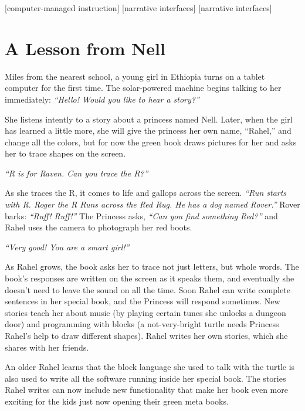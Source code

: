 \documentclass{acm_proc_article-sp}
\begin{document}
[computer-managed instruction]
[narrative interfaces]
[narrative interfaces]


\section{A Lesson from Nell}

Miles from the nearest school, a young girl in Ethiopia turns on a
tablet computer for the first time.  The solar-powered machine begins
talking to her immediately: \textit{``Hello!  Would you like to hear a story?''}

She listens intently to a story about a princess named Nell.  Later, when
the girl has learned a little more, she will give the princess her own
name, ``Rahel,'' and change all the colors, but for now the green
book draws pictures for her and asks her to trace shapes on the screen.

\textit{``R is for Raven.  Can you trace the R?''}

As she traces the R, it comes to life and gallops across the screen.
\textit{``Run starts with R.  Roger the R Runs across the Red Rug.  He has a
dog named Rover.''}  Rover barks: \textit{``Ruff! Ruff!''}  The Princess asks,
\textit{``Can you find something Red?''} and Rahel uses the camera to
photograph her red boots.

\textit{``Very good!  You are a smart girl!''}

As Rahel grows, the book asks her to trace not just letters, but whole
words.  The book's responses are written on the screen as it speaks
them, and eventually she doesn't need to leave the sound on all the
time.  Soon Rahel can write complete sentences in her special book,
and the Princess will respond sometimes.  New stories teach her about
music (by playing certain tunes she unlocks a dungeon door) and
programming with blocks (a not-very-bright turtle needs Princess Rahel's
help to draw different shapes).  Rahel writes her own stories,
which she shares with her friends.

An older Rahel learns that the block language she used to talk with
the turtle is also used to write all the software running inside
her special book.  The stories Rahel writes can now include new
functionality that make her book even more exciting for the kids
just now opening their green meta books.
\end{document}
